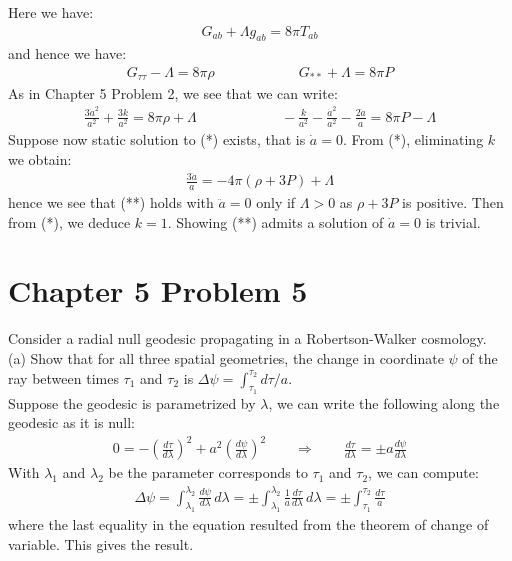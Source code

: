 \documentclass[11pt, onesided]{book}
\theoremstyle{break}
\theoremstyle{break}
\begin{document}
Here we have:
\begin{align*}
G_{ab} + \Lambda g_{ab} = 8\pi T_{ab}
\end{align*}
and hence we have:
\begin{align*}
G_{\tau\tau} - \Lambda = 8\pi \rho\qquad\qquad\qquad G_{**}+\Lambda = 8\pi P
\end{align*}
As in Chapter 5 Problem 2, we see that we can write:
\begin{align}
\frac{3\dot{a}^2}{a^2}+ \frac{3k}{a^2} = 8\pi \rho + \Lambda\qquad\qquad\qquad
-\frac{k}{a^2} - \frac{\dot{a}^2}{a^2}-\frac{2\ddot{a}}{a} = 8\pi P - \Lambda\tag{*}
\end{align}
Suppose now static solution to (*) exists, that is $\dot{a} = 0$. From (*), eliminating $k$ we obtain:
\begin{align}
\frac{3\ddot{a}}{a} = -4\pi (\rho + 3P) +\Lambda\tag{**}
\end{align}
hence we see that (**) holds with $\ddot{a}=0$ only if $\Lambda>0$ as $\rho + 3P$ is positive. Then from (*), we deduce $k = 1$. Showing (**) admits a solution of $\dot{a} = 0$ is trivial. \\






\newpage
\section{Chapter 5 Problem 5}
Consider a radial null geodesic propagating in a Robertson-Walker cosmology. \\

(a) Show that for all three spatial geometries, the change in coordinate $\psi$ of the ray between times $\tau_1$ and $\tau_2$ is $\Delta \psi = \int_{\tau_1}^{\tau_2} d\tau/a$. \\

Suppose the geodesic is parametrized by $\lambda$, we can write the following along the geodesic as it is null:
\begin{align*}
0 = -\left( \frac{d\tau}{d\lambda}\right)^2 + a^2\left(\frac{d\psi}{d\lambda}\right)^2 \qquad \Rightarrow \qquad \frac{d\tau}{d\lambda} = \pm a \frac{d\psi}{d\lambda}
\end{align*}
With $\lambda_1$ and $\lambda_2$ be the parameter corresponds to $\tau_1$ and $\tau_2$, we can compute:
\begin{align*}
\Delta \psi = \int_{\lambda_1}^{\lambda_2} \frac{d\psi}{d\lambda}\, d\lambda = \pm \int_{\lambda_1}^{\lambda_2} \frac{1}{a} \frac{d\tau}{d\lambda}\, d\lambda = \pm \int_{\tau_1}^{\tau_2} \frac{d\tau}{a}
\end{align*}
where the last equality in the equation resulted from the theorem of change of variable. This gives the result.\\
\end{document}
